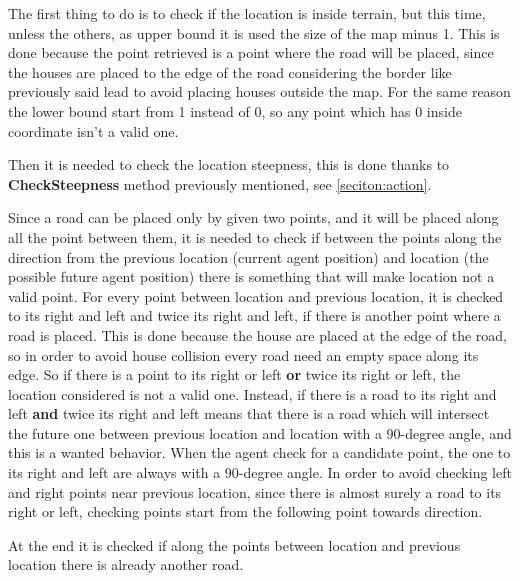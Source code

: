 \documentclass[12pt]{article}
\begin{document}
    The first thing to do is to check if the location is inside terrain, but this time, unless the others, as upper bound it is used the size of the map minus 1. This is done
    because the point retrieved is a point where the road will be placed, since the houses are placed to the edge of the road considering the border like previously said
    lead to avoid placing houses outside the map. For the same reason the lower bound start from 1 instead of 0, so any point which has 0 inside coordinate isn't a valid one.

    Then it is needed to check the location steepness, this is done thanks to \textbf{CheckSteepness} method previously mentioned, see \ref{seciton:action}.

    Since a road can be placed only by given two points, and it will be placed along all the point between them, it is needed to check if between the points along the direction
    from the previous location (current agent position) and location (the possible future agent position) there is something that will make location not 
    a valid point. For every point between location and previous location, it is checked to its right and left and twice its right and left, if there is another point where
    a road is placed. This is done because the house are placed at the edge of the road, so in order to avoid house collision every road need an empty space along
    its edge. So if there is a point to its right or left \textbf{or} twice its right or left, the location considered is not a valid one. Instead, if there is a road to
    its right and left \textbf{and} twice its right and left means that there is a road which will intersect the future one between previous location and location with a 
    90-degree angle, and this is a wanted behavior. When the agent check for a candidate point, the one to its right and left are always with a 90-degree angle. 
    In order to avoid checking left and right points near previous location, since there is almost surely a road to its right or left, checking points start from the 
    following point towards direction.
    
    At the end it is checked if along the points between location and previous location there is already another road.
\end{document}
